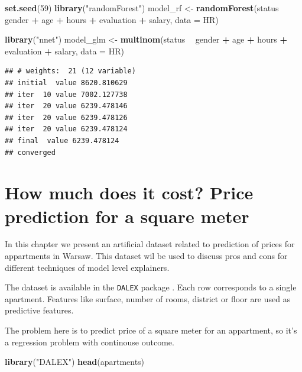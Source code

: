 \documentclass[]{book}
\newenvironment{Shaded}{\begin{snugshade}}{\end{snugshade}}
\newcommand{\DataTypeTok}[1]{\textcolor[rgb]{0.13,0.29,0.53}{#1}}
\newcommand{\DecValTok}[1]{\textcolor[rgb]{0.00,0.00,0.81}{#1}}
\newcommand{\KeywordTok}[1]{\textcolor[rgb]{0.13,0.29,0.53}{\textbf{#1}}}
\newcommand{\NormalTok}[1]{#1}
\newcommand{\OperatorTok}[1]{\textcolor[rgb]{0.81,0.36,0.00}{\textbf{#1}}}
\newcommand{\StringTok}[1]{\textcolor[rgb]{0.31,0.60,0.02}{#1}}
\theoremstyle{definition}
\theoremstyle{definition}
\theoremstyle{definition}
\theoremstyle{remark}
\begin{document}
\begin{Shaded}
\begin{Highlighting}[]
\KeywordTok{set.seed}\NormalTok{(}\DecValTok{59}\NormalTok{)}
\KeywordTok{library}\NormalTok{(}\StringTok{"randomForest"}\NormalTok{)}
\NormalTok{model_rf <-}\StringTok{ }\KeywordTok{randomForest}\NormalTok{(status }\OperatorTok{~}\StringTok{ }\NormalTok{gender }\OperatorTok{+}\StringTok{ }\NormalTok{age }\OperatorTok{+}\StringTok{ }\NormalTok{hours }\OperatorTok{+}\StringTok{ }\NormalTok{evaluation }\OperatorTok{+}\StringTok{ }\NormalTok{salary, }\DataTypeTok{data =}\NormalTok{ HR)}

\KeywordTok{library}\NormalTok{(}\StringTok{"nnet"}\NormalTok{)}
\NormalTok{model_glm <-}\StringTok{ }\KeywordTok{multinom}\NormalTok{(status }\OperatorTok{~}\StringTok{ }\NormalTok{gender }\OperatorTok{+}\StringTok{ }\NormalTok{age }\OperatorTok{+}\StringTok{ }\NormalTok{hours }\OperatorTok{+}\StringTok{ }\NormalTok{evaluation }\OperatorTok{+}\StringTok{ }\NormalTok{salary, }\DataTypeTok{data =}\NormalTok{ HR)}
\end{Highlighting}
\end{Shaded}

\begin{verbatim}
## # weights:  21 (12 variable)
## initial  value 8620.810629 
## iter  10 value 7002.127738
## iter  20 value 6239.478146
## iter  20 value 6239.478126
## iter  20 value 6239.478124
## final  value 6239.478124 
## converged
\end{verbatim}

\hypertarget{apartmentsDataset}{%
\section{How much does it cost? Price prediction for a square
meter}\label{apartmentsDataset}}

In this chapter we present an artificial dataset related to prediction
of prices for appartments in Warsaw. This dataset wil be used to discuss
pros and cons for different techniques of model level explainers.

The dataset is available in the \texttt{DALEX} package \citep{R-DALEX}.
Each row corresponds to a single apartment. Features like surface,
number of rooms, district or floor are used as predictive features.

The problem here is to predict price of a square meter for an
appartment, so it's a regression problem with continouse outcome.

\begin{Shaded}
\begin{Highlighting}[]
\KeywordTok{library}\NormalTok{(}\StringTok{"DALEX"}\NormalTok{)}
\KeywordTok{head}\NormalTok{(apartments)}
\end{Highlighting}
\end{Shaded}
\end{document}
